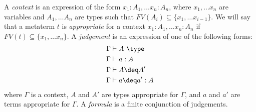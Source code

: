 A \emph{context} is an expression of the form $x_1 : A_1, \ldots x_n : A_n$, where $x_1, \ldots x_n$ are variables and $A_1, \ldots A_n$ are types such that $FV(A_i) \subseteq \{ x_1, \ldots x_{i-1} \}$.
We will say that a metaterm $t$ is \emph{appropriate} for a context $x_1 : A_1, \ldots x_n : A_n$ if $FV(t) \subseteq \{ x_1, \ldots x_n \}$.
A \emph{judgement} is an expression of one of the following forms:
\begin{align*}
\Gamma & \vdash A\ \type \\
\Gamma & \vdash a : A \\
\Gamma & \vdash A \deq A' \\
\Gamma & \vdash a \deq a' : A
\end{align*}
where $\Gamma$ is a context, $A$ and $A'$ are types appropriate for $\Gamma$, and $a$ and $a'$ are terms appropriate for $\Gamma$.
A \emph{formula} is a finite conjunction of judgements.



